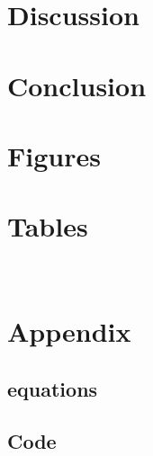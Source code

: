 \documentclass[12pt]{article}
\begin{document}
\section{Discussion}%

\section{Conclusion}%

\section{Figures}
\section{Tables}
\
\section{Appendix}

\subsection{equations}


\subsection{Code}

\begin{verbatim}

\end{verbatim}




\end{document}
